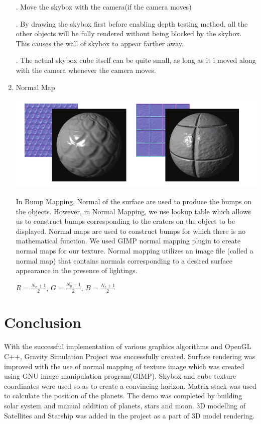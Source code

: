 \documentclass[12pt]{article}
\begin{document}
\begin{enumerate}
	. Move the skybox with the camera(if the camera moves)
	
	. By drawing the skybox first before enabling depth testing method, all the other objects will be fully rendered without being blocked by the skybox. This causes the wall of skybox to appear farther away.

	. The actual skybox cube itself can be quite small, as long as it i moved along with the camera whenever the camera moves.

	
	\item Normal Map
	
	\begin{center}
	\includegraphics[scale = 0.5]{map/1.png}
	\end{center}	
	
	In Bump Mapping, Normal of the surface are used to produce the bumps on the objects. However, in Normal Mapping, we use lookup table which allows us to construct bumps corresponding to the craters on the object to be displayed. Normal maps are used to construct bumps for which there is no mathematical function. We used GIMP normal mapping plugin to create normal maps for our texture. Normal mapping utilizes an image file (called a normal map) that contains normals corresponding to a desired surface appearance in the presence of lightings.
	
	\qquad $R = \frac{N_{x} + 1}{2}$, 
	\qquad $G = \frac{N_{y} + 1}{2}$, 
	\qquad $B = \frac{N_{z} + 1}{2}$
	
\end{enumerate}

\clearpage
\section{Conclusion}
With the successful implementation of various graphics algorithms and OpenGL C++, Gravity Simulation Project was successfully created. Surface rendering was improved with the use of normal mapping of texture image which was created using GNU image manipulation program(GIMP). Skybox and cube texture coordinates were used so as to create a convincing horizon. Matrix stack was used to calculate the position of the planets. The demo was completed by building solar system and manual addition of planets, stars and moon. 3D modelling of Satellites and Starship was added in the project as a part of 3D model rendering.
\end{document}
